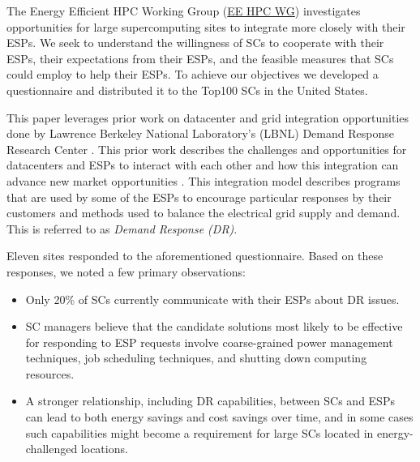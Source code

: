 The Energy Efficient HPC Working Group (\href {http://eehpcwg.lbl.gov/}{EE HPC WG}) 
investigates opportunities for large supercomputing sites to 
integrate more closely with their ESPs.
We seek to understand the willingness of SCs to
cooperate with their ESPs, their expectations from their ESPs, and the feasible measures
that SCs could employ to help their ESPs.
To achieve our objectives we developed a questionnaire and distributed it to 
the Top100 SCs in the United States. 

This paper %
leverages prior work on datacenter and grid integration opportunities
done by Lawrence Berkeley National Laboratory's (LBNL) Demand Response 
Research Center \cite{LBNL}. This prior work describes the challenges and opportunities for datacenters and %
ESPs to interact with each other and how this integration can advance 
new market opportunities \cite{Ghatikar2012a, Ghatikar2012b}. 
This integration model describes programs that are used by some of the ESPs %
to encourage particular responses by their customers and methods 
used to balance the electrical grid supply and demand. This is referred to as \emph{Demand Response (DR)}.

Eleven sites responded to the aforementioned questionnaire. Based on these responses, we noted a few
primary observations:
\begin{itemize}
\item Only 20\% of SCs currently communicate with their ESPs about DR issues.
\item SC managers believe that the candidate solutions most likely to be effective for
responding to ESP requests involve coarse-grained power management techniques, job
scheduling techniques, and shutting down computing resources.
\item A stronger relationship, including DR capabilities, between SCs and
ESPs can lead to both energy savings and cost savings over time, and in some
cases such capabilities might become a requirement for large SCs located in energy-challenged
locations.
\end{itemize}

